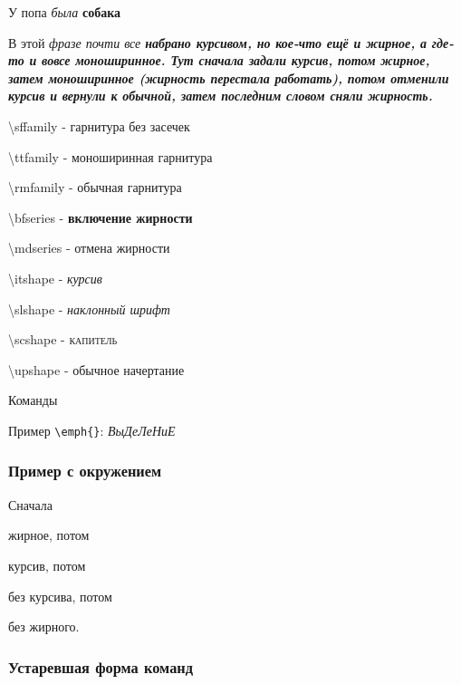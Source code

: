 \documentclass [a4paper,oneside,final,14pt]{extarticle}
\begin{document}

У попа {\it была} {\bf собака}

В этой \itshape фразе почти все \bfseries
набрано курсивом, \ttfamily но кое-что
\upshape ещё и жирное, \rmfamily а где-то
и вовсе \mdseries моноширинное.
Тут сначала задали курсив, потом жирное, затем моноширинное (жирность перестала работать), 
потом отменили курсив и вернули к обычной, затем последним словом сняли жирность.
\normalfont

\textbackslash sffamily - {\sffamily гарнитура без засечек}

\textbackslash ttfamily - {\ttfamily моноширинная гарнитура }

\textbackslash rmfamily - {\rmfamily обычная гарнитура }

\textbackslash bfseries - {\bfseries включение жирности }

\textbackslash mdseries - {\mdseries отмена жирности }

\textbackslash itshape - {\itshape курсив }

\textbackslash slshape - {\slshape наклонный шрифт }

\textbackslash scshape - {\scshape капитель }

\textbackslash upshape - {\upshape обычное начертание }

Команды \normalfont

Пример \texttt{\textbackslash emph\{\}}: \emph{ВыДеЛеНиЕ}
  
\subsubsection{Пример с окружением}

Сначала\begin{bfseries} жирное, потом\begin{itshape} курсив, потом\end{itshape}
без курсива, потом\end{bfseries} без жирного.

\subsubsection{Устаревшая форма команд}
\end{document}
